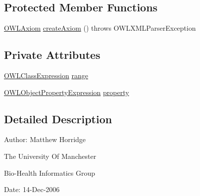 \subsection*{Protected Member Functions}
\begin{DoxyCompactItemize}
\item 
\hyperlink{interfaceorg_1_1semanticweb_1_1owlapi_1_1model_1_1_o_w_l_axiom}{O\-W\-L\-Axiom} \hyperlink{classorg_1_1coode_1_1owlapi_1_1owlxmlparser_1_1_o_w_l_object_property_range_axiom_element_handler_afe1689b91ac577fce07c504f02a337f3}{create\-Axiom} ()  throws O\-W\-L\-X\-M\-L\-Parser\-Exception 
\end{DoxyCompactItemize}
\subsection*{Private Attributes}
\begin{DoxyCompactItemize}
\item 
\hyperlink{interfaceorg_1_1semanticweb_1_1owlapi_1_1model_1_1_o_w_l_class_expression}{O\-W\-L\-Class\-Expression} \hyperlink{classorg_1_1coode_1_1owlapi_1_1owlxmlparser_1_1_o_w_l_object_property_range_axiom_element_handler_aa158379984412b7c12794af0560a2074}{range}
\item 
\hyperlink{interfaceorg_1_1semanticweb_1_1owlapi_1_1model_1_1_o_w_l_object_property_expression}{O\-W\-L\-Object\-Property\-Expression} \hyperlink{classorg_1_1coode_1_1owlapi_1_1owlxmlparser_1_1_o_w_l_object_property_range_axiom_element_handler_a774d57956d5f14cde0db4b9d59205cd6}{property}
\end{DoxyCompactItemize}


\subsection{Detailed Description}
Author\-: Matthew Horridge\par
 The University Of Manchester\par
 Bio-\/\-Health Informatics Group\par
 Date\-: 14-\/\-Dec-\/2006\par
\par
 

